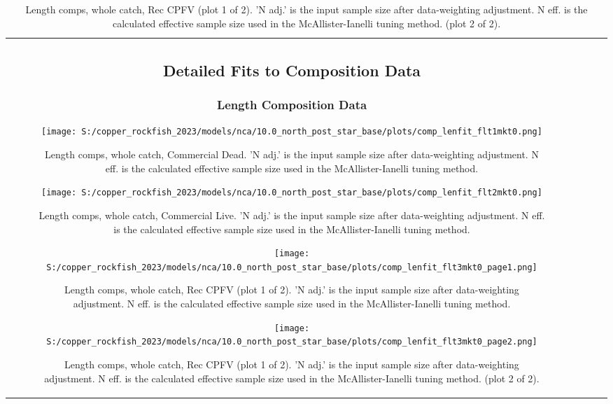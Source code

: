 \documentclass[11pt,
  letterpaper,
]{article}
\begin{document}
\begin{longtable}[t]{c>{\centering\arraybackslash}p{2cm}>{\centering\arraybackslash}p{2cm}>{\centering\arraybackslash}p{2cm}}
\subsection{Detailed Fits to Composition Data}\label{detailed-fit-comps}

\subsubsection{Length Composition Data}\label{length-data}

\begin{figure}
{\centering
\texttt{[image: S:/copper\_rockfish\_2023/models/nca/10.0\_north\_post\_star\_base/plots/comp\_lenfit\_flt1mkt0.png]}
}
\caption{Length comps, whole catch, Commercial Dead.  'N adj.' is the input sample size after data-weighting adjustment. N eff. is the calculated effective sample size used in the McAllister-Ianelli tuning method.\label{fig:comp-lenfit-flt1mkt0}}
\end{figure}

\begin{figure}
{\centering
\texttt{[image: S:/copper\_rockfish\_2023/models/nca/10.0\_north\_post\_star\_base/plots/comp\_lenfit\_flt2mkt0.png]}
}
\caption{Length comps, whole catch, Commercial Live.  'N adj.' is the input sample size after data-weighting adjustment. N eff. is the calculated effective sample size used in the McAllister-Ianelli tuning method.\label{fig:comp-lenfit-flt2mkt0}}
\end{figure}

\begin{figure}
{\centering
\texttt{[image: S:/copper\_rockfish\_2023/models/nca/10.0\_north\_post\_star\_base/plots/comp\_lenfit\_flt3mkt0\_page1.png]}
}
\caption{Length comps, whole catch, Rec CPFV (plot 1 of 2).  'N adj.' is the input sample size after data-weighting adjustment. N eff. is the calculated effective sample size used in the McAllister-Ianelli tuning method.\label{fig:comp-lenfit-flt3mkt0-page1}}
\end{figure}

\begin{figure}
{\centering
\texttt{[image: S:/copper\_rockfish\_2023/models/nca/10.0\_north\_post\_star\_base/plots/comp\_lenfit\_flt3mkt0\_page2.png]}
}
\caption{Length comps, whole catch, Rec CPFV (plot 1 of 2).  'N adj.' is the input sample size after data-weighting adjustment. N eff. is the calculated effective sample size used in the McAllister-Ianelli tuning method. (plot 2 of 2).\label{fig:comp-lenfit-flt3mkt0-page2}}
\end{figure}


\end{longtable}
\end{document}
